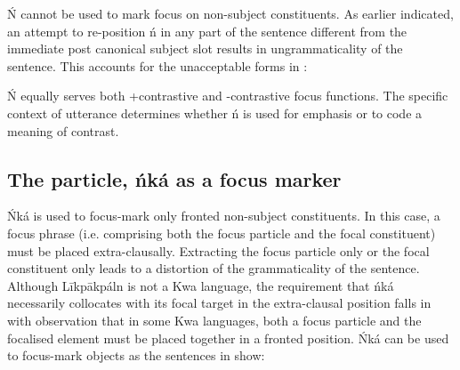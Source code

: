 \documentclass[output=paper,colorlinks,citecolor=brown]{langscibook}
\begin{document}
Ń cannot be used to mark focus on non-subject constituents. As earlier indicated, an attempt to re-position ń in any part of the sentence different from the immediate post canonical subject slot results in ungrammaticality of the sentence. This accounts for the unacceptable forms in :

\ea%
    \label{ex:bisilki:12}
    \z
\z

Ń equally serves both +contrastive and -contrastive focus functions. The specific context of utterance determines whether ń is used for emphasis or to code a meaning of contrast.

\subsection{The particle, ńká as a focus marker}\label{sec:bisilki:5.2}

Ńká is used to focus-mark only fronted non-subject constituents. In this case, a focus phrase (i.e. comprising both the focus particle and the focal constituent) must be placed extra-clausally. Extracting the focus particle only or the focal constituent only leads to a distortion of the grammaticality of the sentence. Although Līkpākpáln is not a Kwa language, the requirement that ńká necessarily collocates with its focal target in the extra-clausal position falls in with  observation that in some Kwa languages, both a focus particle and the focalised element must be placed together in a fronted position. Ńká can be used to focus-mark objects as the sentences in  show:
\end{document}
